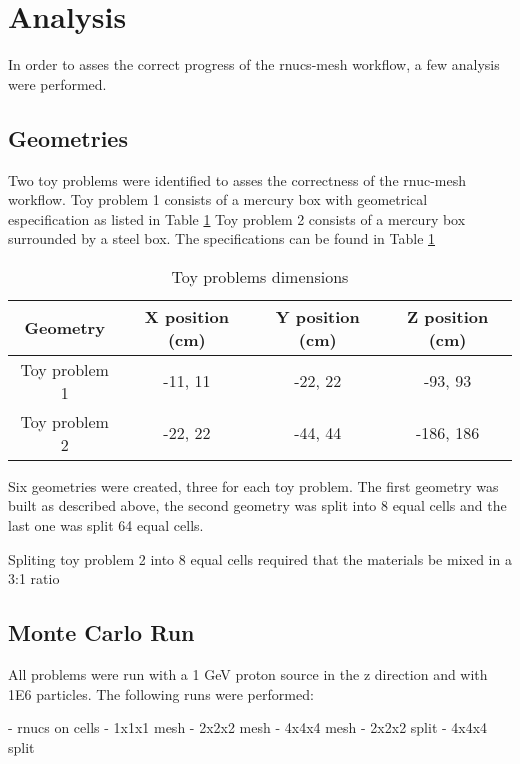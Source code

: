 \section{Analysis}\label{sc:analysis}
In order to asses the correct progress of the rnucs-mesh workflow, a few 
analysis were performed. 

\subsection{Geometries}
Two toy problems were identified to asses the correctness of the 
rnuc-mesh workflow. 
Toy problem 1 consists of a mercury box with geometrical especification as 
listed in Table \ref{tab:geom_dim} 
Toy problem 2 consists of a mercury box surrounded by a steel box. The 
specifications can be found in Table \ref{tab:geom_dim}

\begin{table}[ht]
\begin{tabular}{|c|c|c|c|}
  \hline
  Geometry       & X position (cm) & Y position (cm) & Z position (cm) \\
  \hline  \hline
  Toy problem 1  & -11, 11         & -22, 22         & -93, 93         \\
  \hline
  Toy problem 2  & -22, 22         & -44, 44         & -186, 186       \\
  \hline
\end{tabular}
\caption{Toy problems dimensions}
\label{tab:geom_dim}
\end{table}


Six geometries were created, three for each toy problem. 
The first geometry was built as  described above, the second geometry 
was split into 8 equal cells and the last one was split 64 equal cells. 

Spliting toy problem 2 into 8 equal cells required that the materials 
be mixed in a 3:1 ratio


\subsection{Monte Carlo Run}
All problems were run with a 1 GeV proton source in the z direction and 
with 1E6 particles. 
The following runs were performed:

\begin{list}
- rnucs on cells 
- 1x1x1 mesh
- 2x2x2 mesh
- 4x4x4 mesh 
- 2x2x2 split
- 4x4x4 split
\end{list}



